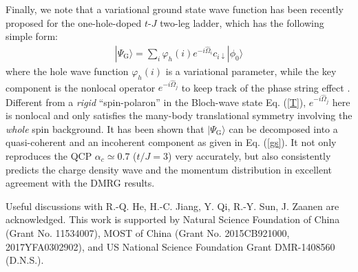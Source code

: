 \documentclass[aps,prb,twocolumn,notitlepage,superscriptaddress,showpacs]{revtex4-1}
\begin{document}
Finally, we note that a variational ground state wave function has been recently proposed \cite{Wang2015} for the one-hole-doped $t$-$J$ two-leg ladder, which has the following simple form:
\begin{align}
 \label{eq:wf}
 |\Psi_{\text{G}}\rangle= \sum_{i} {\varphi}_h(i)e^{-i\hat{\Omega}_i} {c}_{i\downarrow}|\phi_0\rangle
\end{align}
where the hole wave function ${\varphi}_h(i)$ is a variational parameter, while the key component is the nonlocal operator $e^{-i\hat{\Omega}_j}$ to keep track of the phase string effect \cite{Wang2015}. Different from a \emph{rigid} ``spin-polaron'' in the Bloch-wave state Eq. (\ref{T}), $e^{-i\hat{\Omega}_j}$ here is nonlocal and only satisfies the many-body translational symmetry involving the \emph{whole} spin background. It has been shown \cite{Wang2015} that $|\Psi_{\text{G}}\rangle$ can be decomposed into a quasi-coherent and an incoherent component as given in Eq. (\ref{gs}). It not only reproduces the QCP $\alpha_c\simeq 0.7$ ($t/J=3$) very accurately, but also consistently predicts the charge density wave and the momentum distribution in excellent agreement with the DMRG results.


\begin{acknowledgements}
Useful discussions with R.-Q. He, H.-C. Jiang, Y. Qi, R.-Y. Sun, J. Zaanen are acknowledged. This work is supported by Natural Science Foundation of China (Grant No. 11534007), MOST of China (Grant No. 2015CB921000, 2017YFA0302902), and US National Science Foundation Grant  DMR-1408560 (D.N.S.).
\end{acknowledgements}
\end{document}

